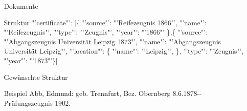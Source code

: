 \documentclass[12pt]{beamer}
\begin{document}
\begin{large}
\begin{frame}{Dokumente}
 \begin{block}{Struktur}
  \normalsize
  \hspace*{0.5cm} 
  "'certificate"': [\{
\newline 
\hspace*{1cm}"'source"': "'Reifezeugnis 1866"',
\newline 
\hspace*{1cm}"'name"': "'Reifezeugnis"',
\newline 
\hspace*{1cm}"'type"': "'Zeugnis"',
\newline 
\hspace*{1cm}"'year"': "'1866"'
\newline 
\hspace*{0.5cm}\},\{
\newline 
\hspace*{1cm}"'source"': "'Abgangszeugnis Universität Leipzig 1873"',
\newline 
\hspace*{1cm}"'name"': "'Abgangszeugnis Universität Leipzig"',
\newline 
\hspace*{1cm}"'location"': \{
\newline 
\hspace*{1cm}\hspace*{0.5cm}"'name"': "'Leipzig"',
\newline 
\hspace*{1cm}\},
\newline 
\hspace*{1cm}"'type"': "'Zeugnis"',
\newline 
\hspace*{1cm}"'year"': "'1873"'\}]
 \end{block} 
\end{frame}


\begin{frame}{Gewünschte Struktur}
 \begin{block}{Beispiel}
  \small
  Abb, Edmund: geb. Trennfurt, Bez. Obernberg 8.6.1878-{}- Prüfungszeugnis 1902.-
 \end{block}
\end{frame}


\end{large}
\end{document}
